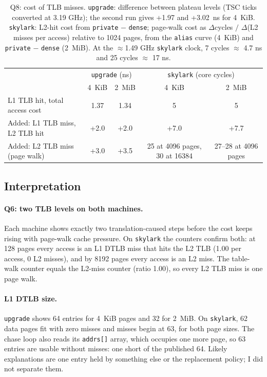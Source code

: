 \documentclass[11pt]{article}
\newcommand{\up}{\texttt{upgrade}}
\newcommand{\sk}{\texttt{skylark}}
\begin{document}
\begin{table}[H]
\centering
\small
\begin{tabular}{lcc|cc}
\toprule
 & \multicolumn{2}{c|}{\up{} (ns)} & \multicolumn{2}{c}{\sk{} (core cycles)} \\
 & 4~KiB & 2~MiB & 4~KiB & 2~MiB \\
\midrule
L1 TLB hit, total access cost & 1.37 & 1.34 & 5 & 5 \\
Added: L1 TLB miss, L2 TLB hit & +2.0 & +2.0 & +7.0 & +7.7 \\
Added: L2 TLB miss (page walk) & +3.0 & +3.5 & 25 at 4096 pages, 30 at 16384 & 27--28 at 4096 pages \\
\bottomrule
\end{tabular}
\caption{Q8: cost of TLB misses. \up{}: difference between plateau levels
(TSC ticks converted at 3.19 GHz); the second run gives +1.97 and +3.02~ns for 4~KiB. \sk{}: L2-hit cost from
\texttt{private} $-$ \texttt{dense}; page-walk cost as $\Delta$cycles $/$
$\Delta$(L2 misses per access) relative to 1024 pages, from the \texttt{alias}
curve (4~KiB) and \texttt{private} $-$ \texttt{dense} (2~MiB). At the
$\approx$1.49 GHz \sk{} clock, 7 cycles $\approx$ 4.7 ns and 25 cycles
$\approx$ 17 ns.}
\label{tab:q8}
\end{table}

\subsection{Interpretation}

\paragraph{Q6: two TLB levels on both machines.} Each machine shows exactly
two translation-caused steps before the cost keeps rising with page-walk
cache pressure. On \sk{} the counters confirm both: at 128 pages every
access is an L1 DTLB miss that hits the L2 TLB (1.00 per access, 0 L2
misses), and by 8192 pages every access is an L2 miss. The table-walk
counter equals the L2-miss counter (ratio 1.00), so every L2 TLB miss is
one page walk.

\paragraph{L1 DTLB size.} \up{} shows 64 entries for 4~KiB pages and 32 for
2~MiB. On \sk{}, 62 data pages fit with zero misses and misses begin at
63, for both page sizes. The chase loop also reads its \texttt{addrs[]}
array, which occupies one more page, so 63 entries are usable without
misses: one short of the published 64. Likely explanations are one entry
held by something else or the replacement policy; I did not separate them.
\end{document}
